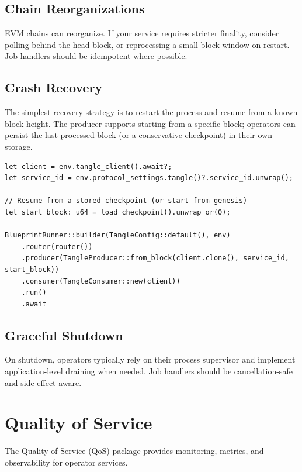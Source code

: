 \documentclass[11pt,a4paper]{article}
\begin{document}
\subsection{Chain Reorganizations}

EVM chains can reorganize. If your service requires stricter finality, consider polling behind the head block, or reprocessing a small block window on restart. Job handlers should be idempotent where possible.

\subsection{Crash Recovery}

The simplest recovery strategy is to restart the process and resume from a known block height. The producer supports starting from a specific block; operators can persist the last processed block (or a conservative checkpoint) in their own storage.

\begin{lstlisting}
let client = env.tangle_client().await?;
let service_id = env.protocol_settings.tangle()?.service_id.unwrap();

// Resume from a stored checkpoint (or start from genesis)
let start_block: u64 = load_checkpoint().unwrap_or(0);

BlueprintRunner::builder(TangleConfig::default(), env)
    .router(router())
    .producer(TangleProducer::from_block(client.clone(), service_id, start_block))
    .consumer(TangleConsumer::new(client))
    .run()
    .await
\end{lstlisting}

\subsection{Graceful Shutdown}

On shutdown, operators typically rely on their process supervisor and implement application-level draining when needed. Job handlers should be cancellation-safe and side-effect aware.

\section{Quality of Service}

The Quality of Service (QoS) package provides monitoring, metrics, and observability for operator services.
\end{document}
